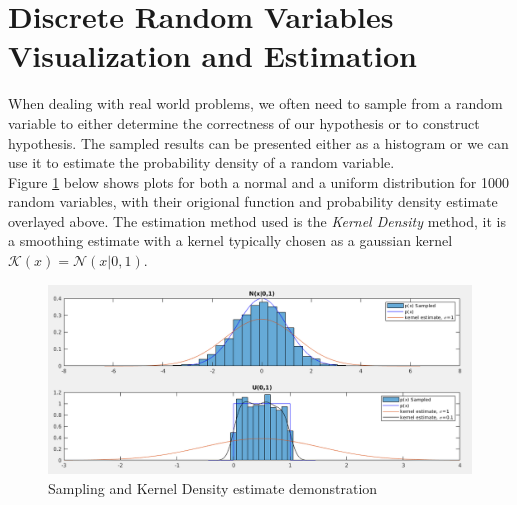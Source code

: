 \documentclass{article}
\begin{document}
\section{Discrete Random Variables Visualization and Estimation}
When dealing with real world problems, we often need to sample from a random variable to either determine the correctness of our hypothesis or to construct hypothesis. The sampled results can be presented either as a histogram or we can use it to estimate the probability density of a random variable.\\
Figure \ref{fig:ksdensity} below shows plots for both a normal and a uniform distribution for 1000 random variables, with their origional function and probability density estimate overlayed above. The estimation method used is the \textit{Kernel Density} method, it is a smoothing estimate with a kernel typically chosen as a gaussian kernel $\mathcal{K}(x)=\mathcal{N}(x|0,1)$.
\begin{figure}[htp]
	\centering
	\includegraphics[width=0.9\linewidth]{task_1.png}
	\caption{Sampling and Kernel Density estimate demonstration}
	\label{fig:ksdensity}
\end{figure}
\end{document}
